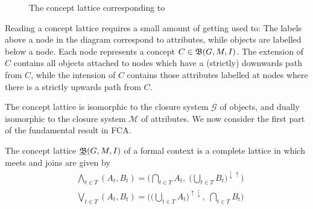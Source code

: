 \begin{figure}[H]
	\vspace{-6em}
	\caption{The concept lattice corresponding to }
	\label{figure:concept-lattice-group-likes}
\end{figure}

\begin{remark}
	Reading a concept lattice requires a small amount of getting used to: The labels above a node in the diagram
	correspond to attributes, while objects are labelled below a node. Each node represents a concept $C \in {\mathfrak B} (G,M,\mathrel{I})$. The extension
	of $C$ contains all objects attached to nodes which have a (strictly) downwards path from $C$, while the intension of
	$C$ contains those attributes labelled at nodes where there is a strictly upwards path from $C$.
\end{remark}

The concept lattice is isomorphic to the closure system $\mathcal{G}$ of objects, and dually isomorphic to the closure system
$\mathcal{M}$ of attributes. We now consider the first part of the fundamental result in FCA.

\begin{theorem}
	\label{theorem:basic-theorem-part1} The concept lattice $\underline{{\mathfrak B}} (G,M,\mathrel{I})$ of a formal context is a complete lattice in which meets
	and joins are given by
	\begin{align*}
		 & \underset{t \in T}\bigwedge (A_{t}, B_{t}) = \Big( \underset{t \in T}\bigcap A_{t}, \; \big(\underset{t \in T}\bigcup B_{t}\big)^{\downarrow \uparrow}\Big) \\
		 & \underset{t \in T}\bigvee (A_{t}, B_{t}) = \Big( \big(\underset{t \in T}\bigcup A_{t}\big)^{\uparrow \downarrow},\; \underset{t \in T}\bigcap B_{t}\Big)
	\end{align*}
\end{theorem}


